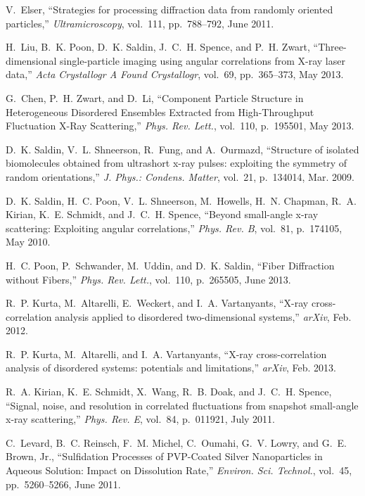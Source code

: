 \documentclass [11pt,fleqn]{article}
\begin{document}
\begin{thebibliography}{10}
V.~Elser, ``{Strategies for processing diffraction data from randomly oriented
  particles},'' {\em Ultramicroscopy}, vol.~111, pp.~788--792, June 2011.

H.~Liu, B.~K. Poon, D.~K. Saldin, J.~C.~H. Spence, and P.~H. Zwart,
  ``{Three-dimensional single-particle imaging using angular correlations from
  X-ray laser data},'' {\em Acta Crystallogr A Found Crystallogr}, vol.~69,
  pp.~365--373, May 2013.

G.~Chen, P.~H. Zwart, and D.~Li, ``{Component Particle Structure in
  Heterogeneous Disordered Ensembles Extracted from High-Throughput Fluctuation
  X-Ray Scattering},'' {\em Phys. Rev. Lett.}, vol.~110, p.~195501, May 2013.

D.~K. Saldin, V.~L. Shneerson, R.~Fung, and A.~Ourmazd, ``{Structure of
  isolated biomolecules obtained from ultrashort x-ray pulses: exploiting the
  symmetry of random orientations},'' {\em J. Phys.: Condens. Matter}, vol.~21,
  p.~134014, Mar. 2009.

D.~K. Saldin, H.~C. Poon, V.~L. Shneerson, M.~Howells, H.~N. Chapman, R.~A.
  Kirian, K.~E. Schmidt, and J.~C.~H. Spence, ``{Beyond small-angle x-ray
  scattering: Exploiting angular correlations},'' {\em Phys. Rev. B}, vol.~81,
  p.~174105, May 2010.

H.~C. Poon, P.~Schwander, M.~Uddin, and D.~K. Saldin, ``{Fiber Diffraction
  without Fibers},'' {\em Phys. Rev. Lett.}, vol.~110, p.~265505, June 2013.

R.~P. Kurta, M.~Altarelli, E.~Weckert, and I.~A. Vartanyants, ``{X-ray
  cross-correlation analysis applied to disordered two-dimensional systems},''
  {\em arXiv}, Feb. 2012.

R.~P. Kurta, M.~Altarelli, and I.~A. Vartanyants, ``{X-ray cross-correlation
  analysis of disordered systems: potentials and limitations},'' {\em arXiv},
  Feb. 2013.

R.~A. Kirian, K.~E. Schmidt, X.~Wang, R.~B. Doak, and J.~C.~H. Spence,
  ``{Signal, noise, and resolution in correlated fluctuations from snapshot
  small-angle x-ray scattering},'' {\em Phys. Rev. E}, vol.~84, p.~011921, July
  2011.

C.~Levard, B.~C. Reinsch, F.~M. Michel, C.~Oumahi, G.~V. Lowry, and G.~E.
  Brown, Jr., ``{Sulfidation Processes of PVP-Coated Silver Nanoparticles in
  Aqueous Solution: Impact on Dissolution Rate},'' {\em Environ. Sci.
  Technol.}, vol.~45, pp.~5260--5266, June 2011.


\end{thebibliography}
\end{document}
